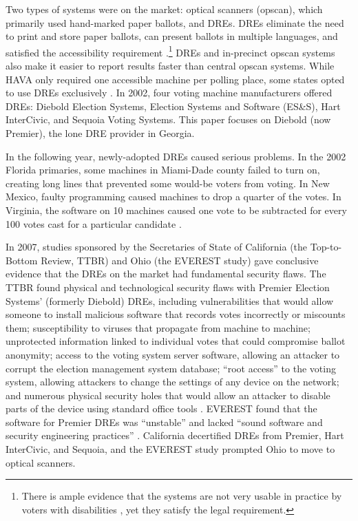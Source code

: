 \documentclass[runningheads]{llncs}
\begin{document}
Two types of systems were on the market: optical
scanners (opscan), which primarily used hand-marked paper ballots, and DREs.
DREs eliminate the need to print and store paper ballots,
can present ballots in multiple languages,
and satisfied the accessibility
requirement \cite{jones_broken_2012}.\footnote{%
  There is ample evidence that the systems are not very usable in practice by voters
  with disabilities \cite{penn_sos_2018}, yet they satisfy the legal requirement.
}
DREs and in-precinct opscan systems also make it easier to report results faster than central opscan systems.
While HAVA only required one accessible machine per polling place,
some states opted to use DREs exclusively \cite{zetter_crisis_2018}.
In 2002, four voting machine manufacturers offered DREs: Diebold Election Systems, 
Election Systems and Software (ES\&S), Hart InterCivic, and Sequoia Voting Systems.
This paper focuses on Diebold (now Premier), the lone DRE provider in Georgia.

In the following year, newly-adopted DREs caused serious problems.
In the 2002 Florida primaries, some machines in Miami-Dade county failed to turn on,
creating long lines that prevented some would-be voters from voting.
In New Mexico, faulty programming caused machines to drop a quarter of the votes.
In Virginia, the software on 10 machines caused one vote to be subtracted for every 100 votes
cast for a particular candidate \cite{wofford_how_2016}.

In 2007, studies sponsored by the Secretaries of State of California (the Top-to-Bottom Review, TTBR) and Ohio (the EVEREST study) gave conclusive 
evidence that the DREs on the market had fundamental security flaws.
The TTBR found physical and technological security flaws with Premier Election Systems' (formerly Diebold) DREs,
including vulnerabilities that would allow someone to install malicious software that records votes incorrectly or miscounts them;
susceptibility to viruses that propagate from machine to machine;
unprotected information linked to individual votes that could compromise ballot anonymity;
access to the voting system server software, allowing an attacker to corrupt the election management system database;
``root access'' to the voting system, allowing attackers to change the settings of any device on the network;
and numerous physical security holes that would allow an attacker to disable parts of the device using standard office tools \cite{TTBR07}.
EVEREST found that the software for Premier DREs was ``unstable'' and lacked ``sound software and security engineering practices'' \cite{everest07}. 
California decertified DREs from Premier, Hart InterCivic, and Sequoia, and the EVEREST study prompted Ohio to move to optical scanners.
\end{document}
